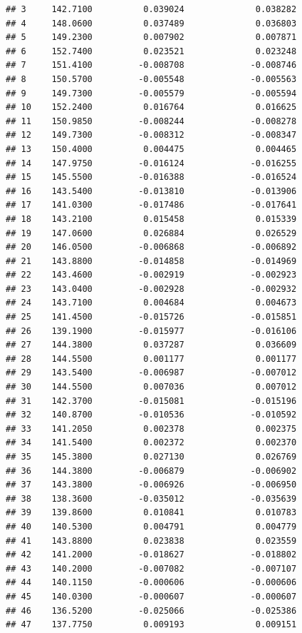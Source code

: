\documentclass[
]{article}
\begin{document}
\begin{verbatim}
## 3     142.7100          0.039024              0.038282
## 4     148.0600          0.037489              0.036803
## 5     149.2300          0.007902              0.007871
## 6     152.7400          0.023521              0.023248
## 7     151.4100         -0.008708             -0.008746
## 8     150.5700         -0.005548             -0.005563
## 9     149.7300         -0.005579             -0.005594
## 10    152.2400          0.016764              0.016625
## 11    150.9850         -0.008244             -0.008278
## 12    149.7300         -0.008312             -0.008347
## 13    150.4000          0.004475              0.004465
## 14    147.9750         -0.016124             -0.016255
## 15    145.5500         -0.016388             -0.016524
## 16    143.5400         -0.013810             -0.013906
## 17    141.0300         -0.017486             -0.017641
## 18    143.2100          0.015458              0.015339
## 19    147.0600          0.026884              0.026529
## 20    146.0500         -0.006868             -0.006892
## 21    143.8800         -0.014858             -0.014969
## 22    143.4600         -0.002919             -0.002923
## 23    143.0400         -0.002928             -0.002932
## 24    143.7100          0.004684              0.004673
## 25    141.4500         -0.015726             -0.015851
## 26    139.1900         -0.015977             -0.016106
## 27    144.3800          0.037287              0.036609
## 28    144.5500          0.001177              0.001177
## 29    143.5400         -0.006987             -0.007012
## 30    144.5500          0.007036              0.007012
## 31    142.3700         -0.015081             -0.015196
## 32    140.8700         -0.010536             -0.010592
## 33    141.2050          0.002378              0.002375
## 34    141.5400          0.002372              0.002370
## 35    145.3800          0.027130              0.026769
## 36    144.3800         -0.006879             -0.006902
## 37    143.3800         -0.006926             -0.006950
## 38    138.3600         -0.035012             -0.035639
## 39    139.8600          0.010841              0.010783
## 40    140.5300          0.004791              0.004779
## 41    143.8800          0.023838              0.023559
## 42    141.2000         -0.018627             -0.018802
## 43    140.2000         -0.007082             -0.007107
## 44    140.1150         -0.000606             -0.000606
## 45    140.0300         -0.000607             -0.000607
## 46    136.5200         -0.025066             -0.025386
## 47    137.7750          0.009193              0.009151

\end{verbatim}
\end{document}
